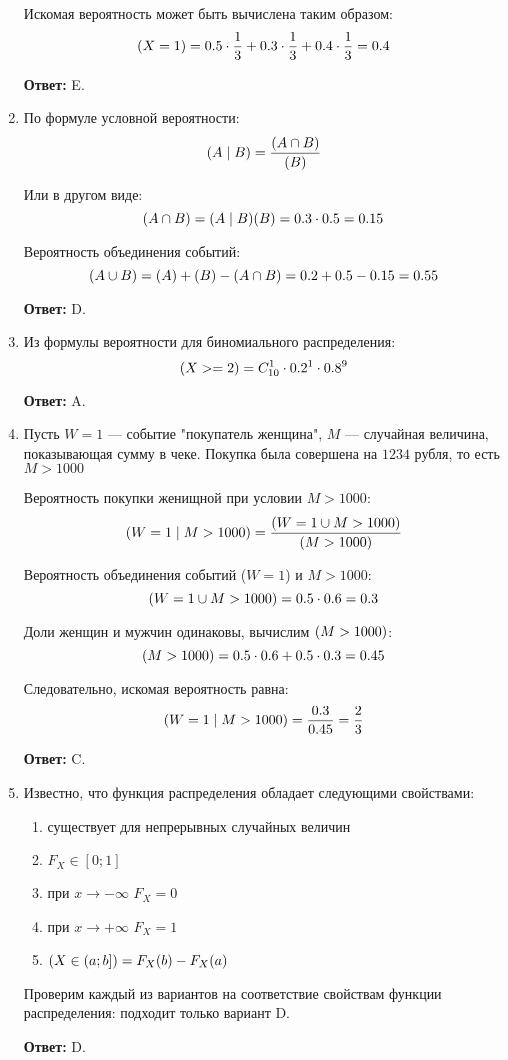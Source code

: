 \documentclass[a4paper]{article} %
\let\P\relax
\DeclareMathOperator{\P}{\mathbb{P}}
\begin{document}
\begin{enumerate}
    Искомая вероятность может быть вычислена таким образом:
    \[
    \P(X=1) = 0.5\cdot\frac{1}{3} + 0.3\cdot\frac{1}{3} + 0.4\cdot\frac{1}{3} = 0.4
    \]
    
    \textbf{Ответ:} E.
    
    
    \item
    По формуле условной вероятности:
    \[
    \P(A\mid B) = \frac{\P(A\cap B)}{\P(B)}
    \]
    
    Или в другом виде:
    \[
    \P(A\cap B)=\P(A\mid B)\P(B) = 0.3 \cdot 0.5 = 0.15
    \]
    
    Вероятность объединения событий:
    \[
    \P(A\cup B) = \P(A) + \P(B) - \P(A\cap B) = 0.2+0.5-0.15 = 0.55
    \]
    
    \textbf{Ответ:} D.
    
    
    \item
    Из формулы вероятности для биномиального распределения:
    \[
    \P(X>=2) = C_{10}^1 \cdot0.2^1 \cdot 0.8^9
    \]
    
    \textbf{Ответ:} A.
    
    
    \item
    Пусть $W=1$ — событие "покупатель женщина", $M$ — случайная величина, показывающая сумму в чеке. 
    Покупка была совершена на $1234$ рубля, то есть $M>1000$
    
    Вероятность покупки женищной при условии $M>1000$:
    \[
    \P(W=1 \mid M>1000) = \frac{\P(W=1 \cup M>1000)}{\P(M>1000)}
    \]
    
    Вероятность объединения событий ($W=1$) и $M>1000$:
    \[
    \P(W=1 \cup M>1000) = 0.5 \cdot 0.6 = 0.3
    \]

    Доли женщин и мужчин одинаковы, вычислим $\P(M>1000)$:
    \[
    \P(M>1000) = 0.5 \cdot 0.6 + 0.5 \cdot 0.3 = 0.45
    \]
    
    Следовательно, искомая вероятность равна:
    \[
    \P(W=1 \mid M>1000) = \frac{0.3}{0.45} = \frac{2}{3}
    \]
    
    \textbf{Ответ:} C.
    
    
    \item
    Известно, что функция распределения обладает следующими свойствами:
    \begin{enumerate}
        \item существует для непрерывных случайных величин
        \item $F_X \in [0; 1]$
        \item при $x\rightarrow{-\infty}$ $F_X = 0$
        \item при $x\rightarrow{+\infty}$ $F_X = 1$
        \item $\P(X \in (a; b]) = F_X(b) - F_X(a)$
    \end{enumerate} 
    
    Проверим каждый из вариантов на соответствие свойствам функции распределения: подходит только вариант D.
    
    \textbf{Ответ:} D.
    
    
\end{enumerate}
\end{document}

